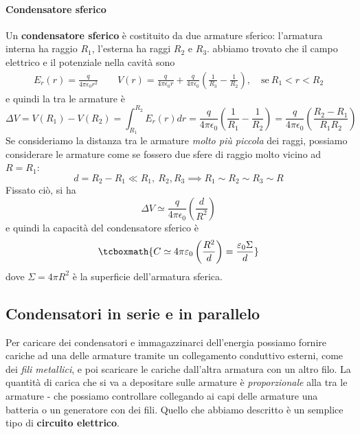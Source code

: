 \paragraph{Condensatore sferico}
Un \textbf{condensatore sferico} è costituito da due armature sferico: l'armatura interna ha raggio $R_1$, l'esterna ha raggi $R_2$ e $R_3$.
abbiamo trovato che il campo elettrico e il potenziale nella cavità sono%
\begin{align*}
	E_{r}(r)=\frac{q}{4\pi\epsilon_0r^2}\qquad
	V(r)=\frac{q}{4\pi\epsilon_0r}+\frac{q}{4\pi\epsilon_0}\left(\frac{1}{R_3}-\frac{1}{R_2}\right), \quad\text{se}\ R_1<r<R_2
\end{align*}
e quindi la \ddp tra le armature è
\begin{equation*}
	\Delta V=V(R_1)-V(R_2)=\int_{R_1}^{R_2}E_r(r)dr=\frac{q}{4\pi\epsilon_0}\left(\frac{1}{R_1}-\frac{1}{R_2}\right)=\frac{q}{4\pi\epsilon_0}\left(\frac{R_2-R_1}{R_1R_2}\right)
\end{equation*}
Se consideriamo la distanza tra le armature \textit{molto più piccola} dei raggi, possiamo considerare le armature come se fossero due sfere di raggio molto vicino ad $R=R_1$:
\begin{equation*}
	d=R_2-R_1\ll R_1,\ R_2, R_3\implies R_1\sim R_2\sim R_3\sim R
\end{equation*}
Fissato ciò, si ha
\begin{equation*}
	\Delta V\simeq\frac{q}{4\pi\epsilon_0}\left(\frac{d}{R^2}\right)
\end{equation*}
e quindi la capacità del condensatore sferico è
\begin{equation}
	\tcboxmath{C\simeq 4\pi\epsilon_0\left(\frac{R^2}{d}\right)=\frac{\epsilon_0\Sigma}{d}}
\end{equation}
dove $\Sigma=4\pi R^2$ è la superficie dell'armatura sferica.
\subsection{Condensatori in serie e in parallelo}\label{condensatoreSerieParallelo}
Per caricare dei condensatori e immagazzinarci dell'energia possiamo fornire cariche ad una delle armature tramite un collegamento conduttivo esterni, come dei \textit{fili metallici}, e poi scaricare le cariche dall'altra armatura con un altro filo. La quantità di carica che si va a depositare sulle armature è \textit{proporzionale} alla \ddp tra le armature - che possiamo controllare collegando ai capi delle armature una batteria o un generatore con dei fili. Quello che abbiamo descritto è un semplice tipo di \textbf{circuito elettrico}.

